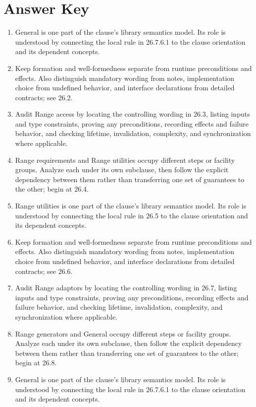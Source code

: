 \documentclass[11pt,letterpaper]{article}
\begin{document}
\clearpage\section{Answer Key}
\begin{enumerate}
\item General is one part of the clause's library semantics model. Its role is understood by connecting the local rule in 26.7.6.1 to the clause orientation and its dependent concepts.
\item Keep formation and well-formedness separate from runtime preconditions and effects. Also distinguish mandatory wording from notes, implementation choice from undefined behavior, and interface declarations from detailed contracts; see 26.2.
\item Audit Range access by locating the controlling wording in 26.3, listing inputs and type constraints, proving any preconditions, recording effects and failure behavior, and checking lifetime, invalidation, complexity, and synchronization where applicable.
\item Range requirements and Range utilities occupy different steps or facility groups. Analyze each under its own subclause, then follow the explicit dependency between them rather than transferring one set of guarantees to the other; begin at 26.4.
\item Range utilities is one part of the clause's library semantics model. Its role is understood by connecting the local rule in 26.5 to the clause orientation and its dependent concepts.
\item Keep formation and well-formedness separate from runtime preconditions and effects. Also distinguish mandatory wording from notes, implementation choice from undefined behavior, and interface declarations from detailed contracts; see 26.6.
\item Audit Range adaptors by locating the controlling wording in 26.7, listing inputs and type constraints, proving any preconditions, recording effects and failure behavior, and checking lifetime, invalidation, complexity, and synchronization where applicable.
\item Range generators and General occupy different steps or facility groups. Analyze each under its own subclause, then follow the explicit dependency between them rather than transferring one set of guarantees to the other; begin at 26.8.
\item General is one part of the clause's library semantics model. Its role is understood by connecting the local rule in 26.7.6.1 to the clause orientation and its dependent concepts.

\end{enumerate}
\end{document}
